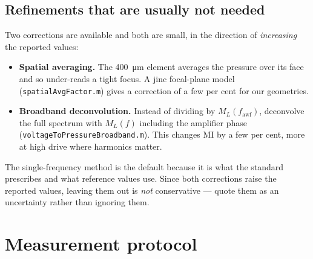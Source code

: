 \documentclass[11pt,a4paper]{article}
\begin{document}
\subsection{Refinements that are usually not needed}\label{sec:broadband}
Two corrections are available and both are small, in the direction of \emph{increasing} the reported
values:
\begin{itemize}
  \item \textbf{Spatial averaging.} The \SI{400}{\micro\metre} element averages the pressure over its
    face and so under-reads a tight focus. A jinc focal-plane model
    (\texttt{spatialAvgFactor.m}) gives a correction of a few per cent for our geometries.
  \item \textbf{Broadband deconvolution.} Instead of dividing by $M_L(f_\mathrm{awf})$, deconvolve
    the full spectrum with $M_L(f)$ including the amplifier phase
    (\texttt{voltageToPressureBroadband.m}). This changes MI by a few per cent, more at high drive
    where harmonics matter.
\end{itemize}
The single-frequency method is the default because it is what the standard prescribes and what
reference values use. Since both corrections raise the reported values, leaving them out is
\emph{not} conservative --- quote them as an uncertainty rather than ignoring them.

\section{Measurement protocol}\label{sec:protocol}

\end{document}
